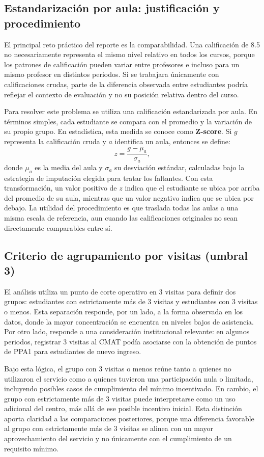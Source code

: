 \documentclass[8pt,a4paper]{article} %
\numberwithin{figure}{subsection}
\begin{document}
\subsection{Estandarización por aula: justificación y procedimiento}
El principal reto práctico del reporte es la comparabilidad. Una calificación de 8.5 no necesariamente representa el mismo nivel relativo en todos los cursos, porque los patrones de calificación pueden variar entre profesores e incluso para un mismo profesor en distintos periodos. Si se trabajara únicamente con calificaciones crudas, parte de la diferencia observada entre estudiantes podría reflejar el contexto de evaluación y no su posición relativa dentro del curso.

Para resolver este problema se utiliza una calificación estandarizada por aula. En términos simples, cada estudiante se compara con el promedio y la variación de su propio grupo. En estadística, esta medida se conoce como \textbf{Z-score}. Si $g$ representa la calificación cruda y $a$ identifica un aula, entonces se define:
\[
z=\frac{g-\mu_a}{\sigma_a},
\]
donde $\mu_a$ es la media del aula y $\sigma_a$ su desviación estándar, calculadas bajo la estrategia de imputación elegida para tratar los faltantes. Con esta transformación, un valor positivo de $z$ indica que el estudiante se ubica por arriba del promedio de su aula, mientras que un valor negativo indica que se ubica por debajo. La utilidad del procedimiento es que traslada todas las aulas a una misma escala de referencia, aun cuando las calificaciones originales no sean directamente comparables entre sí.

\subsection{Criterio de agrupamiento por visitas (umbral 3)}
El análisis utiliza un punto de corte operativo en 3 visitas para definir dos grupos: estudiantes con estrictamente más de 3 visitas y estudiantes con 3 visitas o menos. Esta separación responde, por un lado, a la forma observada en los datos, donde la mayor concentración se encuentra en niveles bajos de asistencia. Por otro lado, responde a una consideración institucional relevante: en algunos periodos, registrar 3 visitas al CMAT podía asociarse con la obtención de puntos de PPA1 para estudiantes de nuevo ingreso.

Bajo esta lógica, el grupo con 3 visitas o menos reúne tanto a quienes no utilizaron el servicio como a quienes tuvieron una participación nula o limitada, incluyendo posibles casos de cumplimiento del mínimo incentivado. En cambio, el grupo con estrictamente más de 3 visitas puede interpretarse como un uso adicional del centro, más allá de ese posible incentivo inicial. Esta distinción aporta claridad a las comparaciones posteriores, porque una diferencia favorable al grupo con estrictamente más de 3 visitas se alinea con un mayor aprovechamiento del servicio y no únicamente con el cumplimiento de un requisito mínimo.
\end{document}
